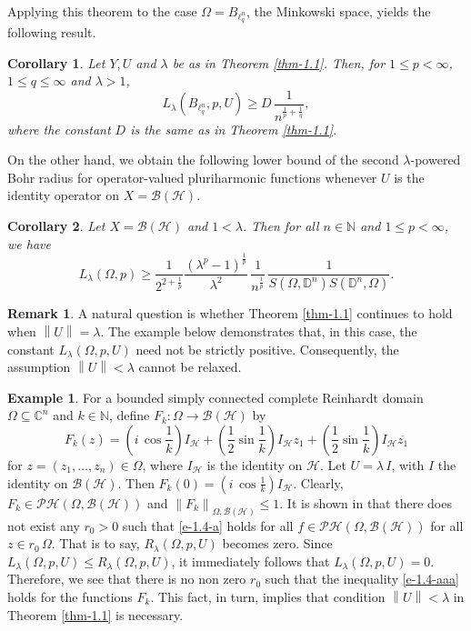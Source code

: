 \documentclass[a4paper,11pt, reqno]{amsart}
\newtheorem{cor}{Corollary}[section]
\theoremstyle{definition}
\newtheorem{example}{Example}[section]
\newtheorem{rem}{Remark}[section]
\newcounter {own}
\newcommand{\norm}[1]{\left\lVert#1\right\rVert}
\begin{document}
Applying this theorem to the case $\Omega=B_{\ell^n_q}$, the Minkowski space, yields the following result.
\begin{cor}
	Let $Y,U$ and $\lambda$ be as in Theorem \ref{thm-1.1}. Then, for $1 \leq p < \infty$, $1 \leq q \leq \infty$ and $\lambda>1$,
	\begin{equation*}
		L_{\lambda}(B_{\ell^n_q}, p,U) \geq D\, \frac{1}{n^{\frac{1}{p}+\frac{1}{q}}},
	\end{equation*}
	where the constant $D$ is the same as in Theorem \ref{thm-1.1}.
\end{cor}	
	On the other hand, we obtain the following lower bound of the second $\lambda$-powered Bohr radius for operator-valued pluriharmonic functions whenever $U$ is the identity operator on $X=\mathcal{B}(\mathcal{H})$.
	\begin{cor}
		Let $X=\mathcal{B}(\mathcal{H})$ and $1<\lambda$. Then for all $n\in \mathbb{N}$ and $1\leq p < \infty$, we have
		\begin{equation*}
			L_{\lambda}(\Omega, p) \geq \frac{1}{2^{2+\frac{1}{p}}} \frac{\left(\lambda^p -1\right)^{\frac{1}{p}}}{\lambda^2}\, \frac{1}{n^{\frac{1}{p}}}\,\frac{1}{S(\Omega,\mathbb{D}^n)S(\mathbb{D}^n,\Omega)}.
		\end{equation*}
	\end{cor}
	\begin{rem}
		A natural question is whether Theorem \ref{thm-1.1} continues to hold when $\norm{U}=\lambda$. The example below demonstrates that, in this case, the constant $L_{\lambda}(\Omega, p,U)$ need not be strictly positive. Consequently, the assumption $\norm{U}<\lambda$ cannot be relaxed.
	\end{rem}
	\begin{example} \label{example-1.1}
		For a bounded simply connected complete Reinhardt domain $\Omega \subseteq \mathbb{C}^n$ and $k \in \mathbb{N}$, define 
		$F_{k}: \Omega \rightarrow \mathcal{B}(\mathcal{H})$ by $$F_{k}(z)=(i\, \cos \frac{1}{k}) I_{\mathcal{H}} + (\frac{1}{2} \sin \frac{1}{k})  I_{\mathcal{H}}z_{1}+(\frac{1}{2} \sin \frac{1}{k})  I_{\mathcal{H}} \overline{z_{1}}$$
		for $z=(z_{1}, \ldots,z_{n}) \in \Omega$, where $I_{\mathcal{H}}$ is the identity on $\mathcal{H}$. Let $U=\lambda \, I$, with $I$ the identity on $\mathcal{B}(\mathcal{H})$. Then $F_{k}(0)=(i\, \cos \frac{1}{k})  I_{\mathcal{H}}$. Clearly, $F_{k} \in \mathcal{PH}(\Omega,\mathcal{B}(\mathcal{H}))$ and $\norm{F_{k}}_{\Omega,\mathcal{B}(\mathcal{H})} \leq 1$. It is shown in \cite{Himadri-local-Banach-1} that there does not exist any $r_{0}>0$ such that \eqref{e-1.4-a} holds for all $f \in \mathcal{PH}(\Omega,\mathcal{B}(\mathcal{H}))$ for all $z \in r_{0}\, \Omega$. That is to say, $R_{\lambda}(\Omega, p,U)$ becomes zero. Since $L_{\lambda}(\Omega, p,U) \leq R_{\lambda}(\Omega, p,U)$, it immediately follows that $L_{\lambda}(\Omega, p,U)=0$. Therefore, we see that there is no non zero $r_{0}$ such that the inequality \eqref{e-1.4-aaa} holds for the functions $F_k$. This fact, in turn, implies that condition $\norm{U}<\lambda$ in Theorem \ref{thm-1.1} is necessary.
	\end{example}
\end{document}
